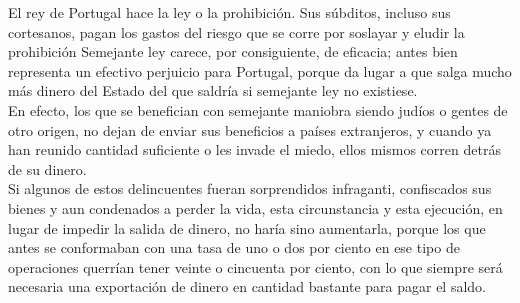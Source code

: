 \documentclass[10pt]{article}
\begin{document}
\begin{multicols}{1}
El rey de Portugal hace la ley o la prohibición. Sus súbditos, incluso sus cortesanos, pagan los gastos del riesgo que se corre por soslayar y eludir la prohibición Semejante ley carece, por consiguiente, de eficacia; antes bien representa un efectivo perjuicio para Portugal, porque da lugar a que salga mucho más dinero del Estado del que saldría si semejante ley no existiese.\\
En efecto, los que se benefician con semejante maniobra siendo judíos o gentes de otro origen, no dejan de enviar sus beneficios a países extranjeros, y cuando ya han reunido cantidad suficiente o les invade el miedo, ellos mismos corren detrás de su dinero.\\
Si algunos de estos delincuentes fueran sorprendidos infraganti, confiscados sus bienes y aun condenados a perder la vida, esta circunstancia y esta ejecución, en lugar de impedir la salida de dinero, no haría sino aumentarla, porque los que antes se conformaban con una tasa de uno o dos por ciento en ese tipo de operaciones querrían tener veinte o cincuenta por ciento, con lo que siempre será necesaria una exportación de dinero en cantidad bastante para pagar el saldo.

\end{multicols}
\end{document}
